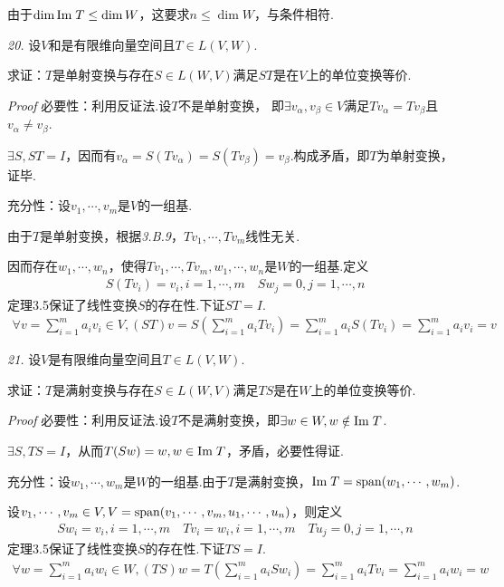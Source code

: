 由于\(\dim \mathrm{Im \;} T\leq \dim W\)，这要求\(n\leq \dim W\)，与条件相符.

\hspace*{\fill}

\textit{20.}
设\(V\)和是有限维向量空间且\(T\in L(V,W)\).

求证：\(T\)是单射变换与存在\(S\in L(W,V)\)满足\(ST\)是在\(V\)上的单位变换等价.

\textit{Proof}
必要性：利用反证法.设\(T\)不是单射变换，
即\(\exists v_\alpha,v_\beta \in V\)满足\(Tv_\alpha=Tv_\beta\)且\(v_\alpha \ne v_\beta\).

\(\exists S,ST=I\)，因而有\(v_\alpha=S(Tv_\alpha)=S(Tv_\beta)=v_\beta\).构成矛盾，即\(T\)为单射变换，证毕.

充分性：设\(v_1,\cdots,v_m\)是\(V\)的一组基.

由于\(T\)是单射变换，根据\textit{3.B.9}，\(Tv_1,\cdots,Tv_m\)线性无关.

因而存在\(w_1,\cdots,w_n\)，使得\(Tv_1,\cdots,Tv_m,w_1,\cdots,w_n\)是\(W\)的一组基.定义
    \begin{align*}
        S(Tv_i)=v_i,i=1,\cdots,m \quad Sw_j=0,j=1,\cdots,n
    \end{align*}
定理3.5保证了线性变换\(S\)的存在性.下证\(ST=I\).
    \begin{align*}
        \forall v=\sum_{i=1}^m a_iv_i\in V,(ST)v=S(\sum_{i=1}^m a_iTv_i)
        =\sum_{i=1}^m a_iS(Tv_i)=\sum_{i=1}^m a_iv_i=v
    \end{align*}

\newpage

\textit{21.}
设\(V\)是有限维向量空间且\(T\in L(V,W)\).

求证：\(T\)是满射变换与存在\(S\in L(W,V)\)满足\(TS\)是在\(W\)上的单位变换等价.

\textit{Proof}
必要性：利用反证法.设\(T\)不是满射变换，即\(\exists w\in W,w\notin \mathrm{Im \;} T\).

\(\exists S,TS=I\)，从而\(T(Sw)=w,w\in \mathrm{Im \;} T\)，矛盾，必要性得证.

充分性：设\(w_1,\cdots,w_m\)是\(W\)的一组基.由于\(T\)是满射变换，\(\mathrm{Im \;} T=\mathrm{span} (w_1,\cdots,w_m)\).

设\(v_1,\cdots,v_m\in V,V=\mathrm{span} (v_1,\cdots,v_m,u_1,\cdots,u_n)\)，则定义
    \begin{align*}
        Sw_i=v_i,i=1,\cdots,m \quad
        Tv_i=w_i,i=1,\cdots,m \quad Tu_j=0,j=1,\cdots,n
    \end{align*}
定理3.5保证了线性变换\(S\)的存在性.下证\(TS=I\).
    \begin{align*}
        \forall w=\sum_{i=1}^m a_iw_i\in W,(TS)w=T(\sum_{i=1}^m a_iSw_i) 
        =\sum_{i=1}^m a_iTv_i=\sum_{i=1}^m a_iw_i=w
    \end{align*}

